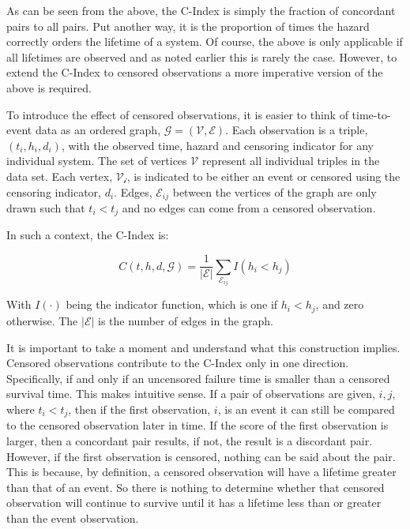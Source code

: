 As can be seen from the above, the C-Index is simply the fraction of concordant pairs to all pairs. Put another way, it is the proportion of times the hazard correctly orders the lifetime of a system. Of course, the above is only applicable if all lifetimes are observed and as noted earlier this is rarely the case. However, to extend the C-Index to censored observations a more imperative version of the above is required. 


To introduce the effect of censored observations, it is easier to think of time-to-event data as an ordered graph, $\mathcal{G} = (\mathcal{V}, \mathcal{E})$\cite{Steck2008}. Each observation is a triple, $(t_i, h_i, d_i)$, with the observed time, hazard and censoring indicator for any individual system. The set of vertices $\mathcal{V}$ represent all individual triples in the data set. Each vertex, $\mathcal{V_i}$, is indicated to be either an event or censored using the censoring indicator, $d_i$. Edges, $\mathcal{E}_{ij}$ between the vertices of the graph are only drawn such that $t_i < t_j$ and no edges can come from a censored observation.


In such a context, the C-Index is:

$$ C(t, h, d, \mathcal{G}) = \frac{1}{\mathcal{|E|}} \sum_{\mathcal{E}_{ij}} I(h_i < h_j) $$

With $I(\cdot)$ being the indicator function, which is one if $h_i < h_j$, and zero otherwise. The $\mathcal{|E|}$ is the number of edges in the graph.

It is important to take a moment and understand what this construction implies. Censored observations contribute to the C-Index only in one direction. Specifically, if and only if an uncensored failure time is smaller than a censored survival time. This makes intuitive sense. If a pair of observations are given, $i,j$, where $t_i < t_j$, then if the first observation, $i$, is an event it can still be compared to the censored observation later in time. If the score of the first observation is larger, then a concordant pair results, if not, the result is a discordant pair. However, if the first observation is censored, nothing can be said about the pair. This is because, by definition, a censored observation will have a lifetime greater than that of an event. So there is nothing to determine whether that censored observation will continue to survive until it has a lifetime less than or greater than the event observation. 

